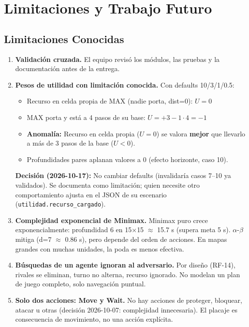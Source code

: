 \chapter{Limitaciones y Trabajo Futuro}
\label{ch:limitaciones}

\section{Limitaciones Conocidas}
\label{sec:limitaciones-conocidas}

\begin{enumerate}
\item \textbf{Validación cruzada.} El equipo revisó los módulos, las pruebas y la
  documentación antes de la entrega.
  
\item \textbf{Pesos de utilidad con limitación conocida.} Con defaults 10/3/1/0.5:
  \begin{itemize}
  \item Recurso en celda propia de MAX (nadie porta, dist=0): $U = 0$
  \item MAX porta y está a 4 pasos de su base: $U = +3 - 1\cdot4 = -1$
  \item \textbf{Anomalía:} Recurso en celda propia ($U=0$) se valora \textbf{mejor} que
    llevarlo a más de 3 pasos de la base ($U < 0$).
  \item Profundidades pares aplanan valores a 0 (efecto horizonte, caso 10).
  \end{itemize}
  \textbf{Decisión (2026-10-17):} No cambiar defaults (invalidaría casos 7--10 ya validados).
  Se documenta como limitación; quien necesite otro comportamiento ajusta
   en el JSON de su escenario (\texttt{utilidad.recurso\_cargado}).

\item \textbf{Complejidad exponencial de Minimax.} Minimax puro crece exponencialmente:
  profundidad 6 en 15$\times$15 $\approx$ 15.7 s (supera meta 5 s). $\alpha$-$\beta$ mitiga
  (d=7 $\approx$ 0.86 s), pero depende del orden de acciones. En mapas grandes con muchas
  unidades, la poda es menos efectiva.

\item \textbf{Búsquedas de un agente ignoran al adversario.} Por diseño (RF-14), rivales se
  eliminan, turno no alterna, recurso ignorado. No modelan un plan de juego completo,
  solo navegación puntual.

\item \textbf{Solo dos acciones: Move y Wait.} No hay acciones de proteger, bloquear, atacar
  u otras (decisión 2026-10-07: complejidad innecesaria). El placaje es consecuencia de
  movimiento, no una acción explícita.


\end{enumerate}
